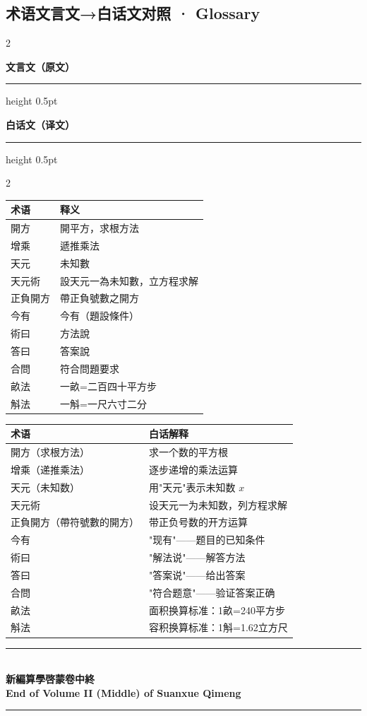 \documentclass[11pt,a4paper]{article}
\newcommand{\longline}{\noindent\rule{\textwidth}{0.4pt}}
\newcommand{\classicalheader}{%
  \begin{center}
  \textbf{\textcolor{headerclassical}{\large 文言文（原文）}}
  \end{center}
  \vspace{-0.3em}
  \hrule height 0.5pt \color{classicalborder}
  \vspace{0.5em}
}
\newcommand{\modernheader}{%
  \begin{center}
  \textbf{\textcolor{headermodern}{\large 白话文（译文）}}
  \end{center}
  \vspace{-0.3em}
  \hrule height 0.5pt \color{modernborder}
  \vspace{0.5em}
}
\begin{document}
\vspace{0.5em}

\subsection{术语文言文→白话文对照 · Glossary}

\begin{paracol}{2}
\begin{leftcolumn}
\classicalheader
\end{leftcolumn}
\begin{rightcolumn}
\modernheader
\end{rightcolumn}
\end{paracol}

\begin{paracol}{2}
\begin{leftcolumn}
\begin{tabular}{ll}
\toprule
\textbf{术语} & \textbf{释义} \\
\midrule
開方 & 開平方，求根方法 \\
增乘 & 遞推乘法 \\
天元 & 未知數 \\
天元術 & 設天元一為未知數，立方程求解 \\
正負開方 & 帶正負號數之開方 \\
今有 & 今有（題設條件） \\
術曰 & 方法說 \\
答曰 & 答案說 \\
合問 & 符合問題要求 \\
畝法 & 一畝=二百四十平方步 \\
斛法 & 一斛=一尺六寸二分 \\
\bottomrule
\end{tabular}
\end{leftcolumn}
\begin{rightcolumn}
\begin{tabular}{ll}
\toprule
\textbf{术语} & \textbf{白话解释} \\
\midrule
開方（求根方法） & 求一个数的平方根 \\
增乘（递推乘法） & 逐步递增的乘法运算 \\
天元（未知数） & 用"天元"表示未知数 $x$ \\
天元術 & 设天元一为未知数，列方程求解 \\
正負開方（帶符號數的開方） & 带正负号数的开方运算 \\
今有 & "现有"——题目的已知条件 \\
術曰 & "解法说"——解答方法 \\
答曰 & "答案说"——给出答案 \\
合問 & "符合题意"——验证答案正确 \\
畝法 & 面积换算标准：1畝=240平方步 \\
斛法 & 容积换算标准：1斛=1.62立方尺 \\
\bottomrule
\end{tabular}
\end{rightcolumn}
\end{paracol}

\vspace{1cm}

\begin{center}
\longline\\[0.5cm]
{\Large\bfseries\color{chaptercolor}
新編算學啓蒙卷中終\\[0.3cm]
End of Volume II (Middle) of Suanxue Qimeng
}\\[0.5cm]
\longline
\end{center}
\end{document}
